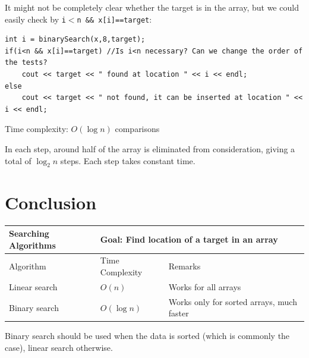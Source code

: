 It might not be completely clear whether the target is in the array, but we could easily check by \texttt{i$<$n \&\& x[i]==target}:

\begin{lstlisting}
int i = binarySearch(x,8,target);
if(i<n && x[i]==target) //Is i<n necessary? Can we change the order of the tests?
    cout << target << " found at location " << i << endl;
else 
    cout << target << " not found, it can be inserted at location " << i << endl;
\end{lstlisting}

Time complexity: $O(\log n)$ comparisons
\vspace{6mm}

In each step, around half of the array is eliminated from consideration, giving a total of $\log_2 n$ steps. Each step takes constant time.

\section{Conclusion}

\begin{table}[h]
    \centering
    \begin{tabular}{|m{6em}|m{9em}|m{18em}|}
        \hline  
        \textbf{Searching Algorithms} & 
        \multicolumn{2}{l|}{Goal: Find location of a target in an array}
        \\ \hline \hline
        
        Algorithm &
        Time Complexity & 
        Remarks
        \\ \hline \hline
        
        Linear search &
        $O(n)$ &
        Works for all arrays
        \\ \hline
        
        Binary search &
        $O(\log n)$ &
        Works only for sorted arrays, much faster
        \\ \hline
    \end{tabular}
\end{table}

Binary search should be used when the data is sorted (which is commonly the case), linear search otherwise.